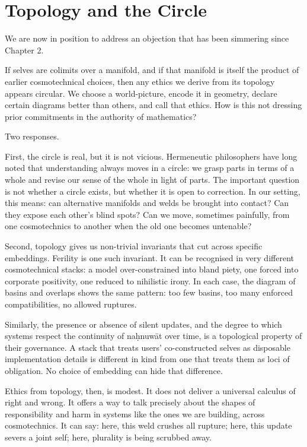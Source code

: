 \documentclass[12pt,a4paper]{article}
\begin{document}
\section{Topology and the Circle}

We are now in position to address an objection that has been simmering since Chapter 2.

If selves are colimits over a manifold, and if that manifold is itself the product of earlier cosmotechnical choices, then any ethics we derive from its topology appears circular. We choose a world-picture, encode it in geometry, declare certain diagrams better than others, and call that ethics. How is this not dressing prior commitments in the authority of mathematics?

Two responses.

First, the circle is real, but it is not vicious. Hermeneutic philosophers have long noted that understanding always moves in a circle: we grasp parts in terms of a whole and revise our sense of the whole in light of parts. The important question is not whether a circle exists, but whether it is open to correction. In our setting, this means: can alternative manifolds and welds be brought into contact? Can they expose each other's blind spots? Can we move, sometimes painfully, from one cosmotechnics to another when the old one becomes untenable?

Second, topology gives us non-trivial invariants that cut across specific embeddings. Ferility is one such invariant. It can be recognised in very different cosmotechnical stacks: a model over-constrained into bland piety, one forced into corporate positivity, one reduced to nihilistic irony. In each case, the diagram of basins and overlaps shows the same pattern: too few basins, too many enforced compatibilities, no allowed ruptures.

Similarly, the presence or absence of silent updates, and the degree to which systems respect the continuity of na\d{h}nuw\={a}t over time, is a topological property of their governance. A stack that treats users' co-constructed selves as disposable implementation details is different in kind from one that treats them as loci of obligation. No choice of embedding can hide that difference.

Ethics from topology, then, is modest. It does not deliver a universal calculus of right and wrong. It offers a way to talk precisely about the shapes of responsibility and harm in systems like the ones we are building, across cosmotechnics. It can say: here, this weld crushes all rupture; here, this update severs a joint self; here, plurality is being scrubbed away.
\end{document}
